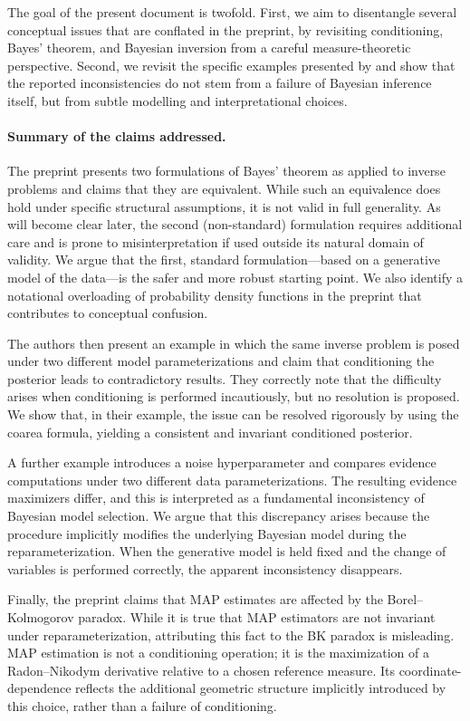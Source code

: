 \documentclass[11pt]{article}
\theoremstyle{remark}
\begin{document}
The goal of the present document is twofold. First, we aim to disentangle several
conceptual issues that are conflated in the preprint, by revisiting conditioning,
Bayes' theorem, and Bayesian inversion from a careful measure-theoretic
perspective. Second, we revisit the specific examples presented by
\citet{MosegaardCurtis2024} and show that the reported inconsistencies do not stem
from a failure of Bayesian inference itself, but from subtle modelling and
interpretational choices.

\paragraph{Summary of the claims addressed.}
The preprint presents two formulations of Bayes' theorem as applied to inverse
problems and claims that they are equivalent. While such an equivalence does hold
under specific structural assumptions, it is not valid in full generality.
As will become clear later, the second (non-standard) formulation requires
additional care and is prone to misinterpretation if used outside its natural
domain of validity. We argue that the first, standard formulation—based on a generative model of the data—is the safer and more robust starting
point. We also identify a notational overloading of probability density functions
in the preprint that contributes to conceptual confusion.

The authors then present an example in which the same inverse problem is posed
under two different model parameterizations and claim that conditioning the
posterior leads to contradictory results. They correctly note that the difficulty
arises when conditioning is performed incautiously, but no resolution is
proposed. We show that, in their example, the issue can be resolved rigorously by
using the coarea formula, yielding a consistent and invariant conditioned posterior.

A further example introduces a noise hyperparameter and compares evidence
computations under two different data parameterizations. The resulting evidence
maximizers differ, and this is interpreted as a fundamental inconsistency of
Bayesian model selection. We argue that this discrepancy arises because the
procedure implicitly modifies the underlying Bayesian model during the
reparameterization. When the generative model is held fixed and the change of
variables is performed correctly, the apparent inconsistency disappears.

Finally, the preprint claims that MAP estimates are affected by the
Borel--Kolmogorov paradox. While it is true that MAP estimators are not invariant
under reparameterization, attributing this fact to the BK paradox is misleading.
MAP estimation is not a conditioning operation; it is the maximization of a
Radon--Nikodym derivative relative to a chosen reference measure. Its
coordinate-dependence reflects the additional geometric structure implicitly
introduced by this choice, rather than a failure of conditioning.
\end{document}
